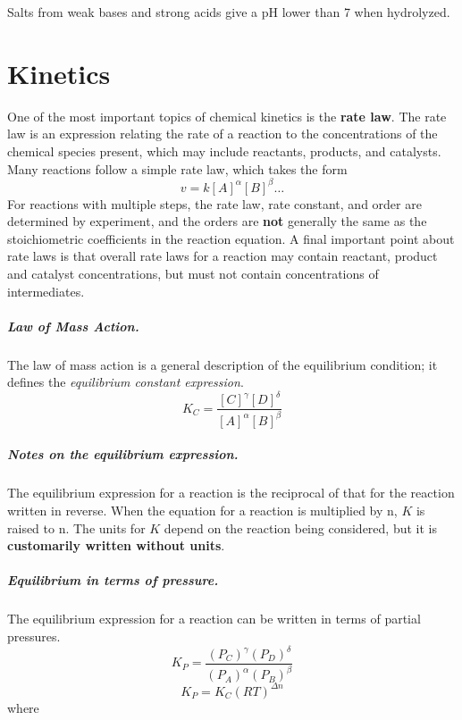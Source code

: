 \documentclass[12pt, oneside]{book}
\begin{document}
Salts from weak bases and strong acids give a pH lower than 7 when hydrolyzed.

\chapter{Kinetics}

One of the most important topics of chemical kinetics is the \textbf{rate law}.
The rate law is an expression relating the rate of a reaction to the
concentrations of the chemical species present, which may include reactants,
products, and catalysts. Many reactions follow a simple rate law, which takes
the form
\[v = k [A]^\alpha [B]^\beta \ldots\]
For reactions with multiple steps, the rate law, rate constant, and order are
determined by experiment, and the orders are \textbf{not} generally the same as
the stoichiometric coefficients in the reaction equation.  A final important
point about rate laws is that overall rate laws for a reaction may contain
reactant, product and catalyst concentrations, but must not contain
concentrations of intermediates.

\paragraph{Law of Mass Action.} The law of mass action is a general description
of the equilibrium condition; it defines the \textit{equilibrium constant
expression}.
\[K_C = \frac{[C]^\gamma [D]^\delta}{[A]^\alpha [B]^\beta}\]

\paragraph{Notes on the equilibrium expression.} The equilibrium expression for
a reaction is the reciprocal of that for the reaction written in reverse. When
the equation for a reaction is multiplied by n, \(K\) is raised to n.  The
units for \(K\) depend on the reaction being considered, but it is
\textbf{customarily written without units}.

\paragraph{Equilibrium in terms of pressure.} The equilibrium expression for a
reaction can be written in terms of partial pressures.
\[K_P = \frac{\left(P_C\right)^\gamma
\left(P_D\right)^\delta}{\left(P_A\right)^\alpha \left(P_B\right)^\beta}\]
\[K_P = K_C (RT)^{\Delta n}\]
where
\end{document}
